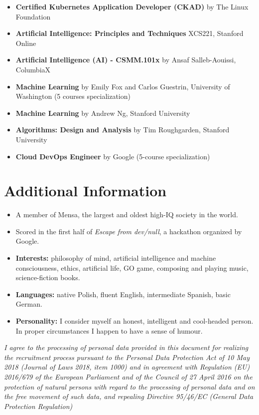 \documentclass[12pt,a4paper]{article}
\begin{document}
\begin{itemize}
  \item \textbf{Certified Kubernetes Application Developer (CKAD)} by The Linux Foundation

  \item \textbf{Artificial Intelligence: Principles and Techniques} XCS221, Stanford Online

  \item \textbf{Artificial Intelligence (AI) - CSMM.101x} by Ansaf Salleb-Aouissi, ColumbiaX

  \item \textbf{Machine Learning} by Emily Fox and Carlos Guestrin, University of Washington (5 courses specialization)

  \item \textbf{Machine Learning} by Andrew Ng, Stanford University

  \item \textbf{Algorithms: Design and Analysis} by Tim Roughgarden, Stanford University

  \item \textbf{Cloud DevOps Engineer} by Google (5-course specialization)
\end{itemize}

\section{Additional Information}

\begin{itemize}
  \item A member of Mensa, the largest and oldest high-IQ society in the world.

  \item Scored in the first half of \textit{Escape from dev/null}, a hackathon organized by Google.

  \item \textbf{Interests:} philosophy of mind, artificial intelligence and machine consciousness, ethics, artificial life, GO game, composing and playing music, science-fiction books.

  \item \textbf{Languages:} native Polish, fluent English, intermediate Spanish, basic German.

  \item \textbf{Personality:} I consider myself an honest, intelligent and cool-headed person. In proper circumstances I happen to have a sense of humour.
\end{itemize}

\vspace{1em}

{\small\itshape
I agree to the processing of personal data provided in this document for realizing the recruitment process pursuant to the Personal Data Protection Act of 10 May 2018 (Journal of Laws 2018, item 1000) and in agreement with Regulation (EU) 2016/679 of the European Parliament and of the Council of 27 April 2016 on the protection of natural persons with regard to the processing of personal data and on the free movement of such data, and repealing Directive 95/46/EC (General Data Protection Regulation)
}
\end{document}
